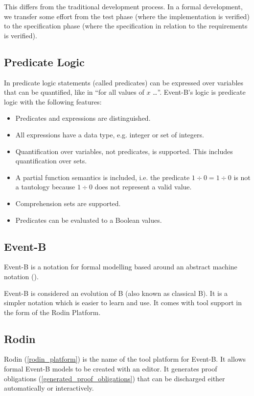 This differs from the traditional development process. In a formal development, we transfer some effort from the test phase (where the implementation is verified) to the specification phase (where the specification in relation to the requirements is verified).

\subsection{Predicate Logic}
\label{tut_predicate_logic}

In predicate logic statements (called predicates) can be expressed over variables
  that can be quantified, like in ``for all values of $x$ \ldots''.
Event-B's logic is predicate logic with the following features:
\begin{itemize}
\item Predicates and expressions are distinguished.
\item All expressions have a data type, e.g. integer or set of integers.
\item Quantification over variables, not predicates, is supported.
  This includes quantification over sets.
\item A partial function semantics is included, i.e. the predicate $1\div 0 = 1\div 0$ is not
  a tautology because $1\div 0$ does not represent a valid value.
\item Comprehension sets are supported.
\item Predicates can be evaluated to a Boolean values.
\end{itemize}

\subsection{Event-B}
\label{tut_eventb}

Event-B is a notation for formal modelling based around an abstract machine notation ().

Event-B is considered an evolution of B (also known as classical B). It is a simpler notation which is easier to learn and use. It comes with tool support in the form of the Rodin Platform.

\subsection{Rodin}
\label{tut_rodin}

Rodin (\ref{rodin_platform}) is the name of the tool platform for Event-B.  It allows formal Event-B models to be created with an editor.  It generates proof obligations (\ref{generated_proof_obligations}) that can be discharged either automatically or interactively.

